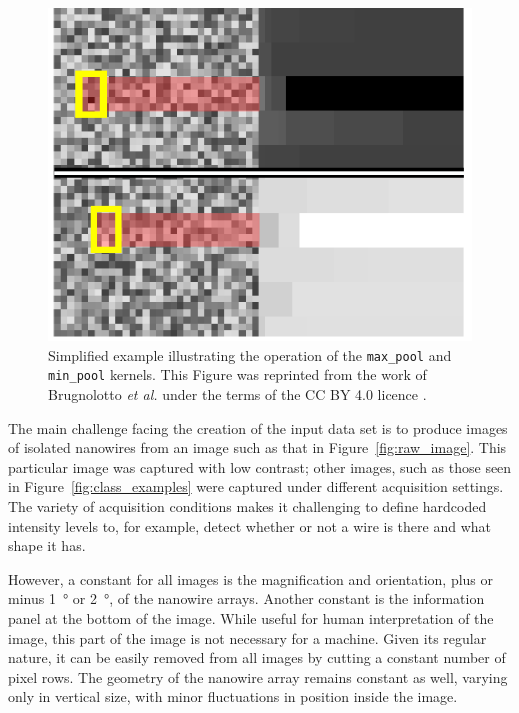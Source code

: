 \begin{figure}
    \centering
    \includegraphics{5_Yield_Analysis/Fig/min_max_pool.pdf}
    \caption[Simplified example illustrating the operation of the \texttt{max\_pool} and \texttt{min\_pool} kernels.]{Simplified example illustrating the operation of the \texttt{max\_pool} and \texttt{min\_pool} kernels. This Figure was reprinted from the work of Brugnolotto \textit{et al.} \cite{Brugnolotto2024} under the terms of the CC BY 4.0 licence \cite{CCBY40}.}
    \label{fig:min_max_pool}
\end{figure}

The main challenge facing the creation of the input data set is to produce images of isolated nanowires from an image such as that in Figure~\ref{fig:raw_image}. This particular image was captured with low contrast; other images, such as those seen in Figure~\ref{fig:class_examples} were captured under different acquisition settings. The variety of acquisition conditions makes it challenging to define hardcoded intensity levels to, for example, detect whether or not a wire is there and what shape it has.

However, a constant for all images is the magnification and orientation, plus or minus \qty{1}{\degree} or \qty{2}{\degree}, of the nanowire arrays. Another constant is the information panel at the bottom of the image. While useful for human interpretation of the image, this part of the image is not necessary for a machine. Given its regular nature, it can be easily removed from all images by cutting a constant number of pixel rows. The geometry of the nanowire array remains constant as well, varying only in vertical size, with minor fluctuations in position inside the image.

